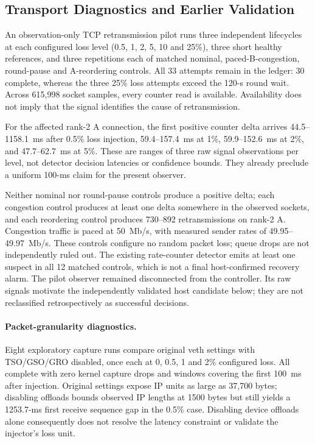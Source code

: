 \documentclass[sigconf]{acmart}
\begin{document}
\subsection{Transport Diagnostics and Earlier Validation}
An observation-only TCP retransmission pilot runs three independent
lifecycles at each configured loss level (0.5, 1, 2, 5, 10 and 25\%),
three short healthy references, and three repetitions each of matched
nominal, paced-B-congestion, round-pause and A-reordering controls.
All 33 attempts remain in the ledger: 30 complete, whereas the three
25\% loss attempts exceed the 120-s round wait. Across 615,998 socket
samples, every counter read is available. Availability does not imply
that the signal identifies the cause of retransmission.

For the affected rank-2 A connection, the first positive counter delta
arrives 44.5--1158.1~ms after 0.5\% loss injection, 59.4--157.4~ms at
1\%, 59.9--152.6~ms at 2\%, and 47.7--62.7~ms at 5\%. These are ranges
of three raw signal observations per level, not detector decision
latencies or confidence bounds. They already preclude a uniform
100-ms claim for the present observer.

Neither nominal nor round-pause controls produce a positive delta;
each congestion control produces at least one delta somewhere in the
observed sockets, and each reordering control produces 730--892
retransmissions on rank-2 A. Congestion traffic is paced at 50~Mb/s,
with measured sender rates of 49.95--49.97~Mb/s. These controls configure
no random packet loss; queue drops are not independently ruled out.
The existing rate-counter detector emits at least one suspect in all
12 matched controls, which is not a final host-confirmed recovery alarm.
The pilot observer remained disconnected from the controller. Its raw
signals motivate the independently validated host candidate below; they
are not reclassified retrospectively as successful decisions.

\paragraph{Packet-granularity diagnostics.}
Eight exploratory capture runs compare original veth settings with
TSO/GSO/GRO disabled, once each at 0, 0.5, 1 and 2\% configured loss.
All complete with zero kernel capture drops and windows covering the
first 100~ms after injection. Original settings expose IP units as large
as 37,700 bytes; disabling offloads bounds observed IP lengths at
1500 bytes but still yields a 1253.7-ms first receive sequence gap in
the 0.5\% case. Disabling device offloads alone consequently does not
resolve the latency constraint or validate the injector's loss unit.
\end{document}
